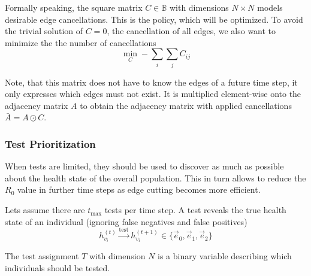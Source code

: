 Formally speaking, the square matrix $C \in \mathbb{B}$ with dimensions $N \times N$ models desirable edge cancellations.
This is the policy, which will be optimized.
To avoid the trivial solution of $C=0$, the cancellation of all edges, we also want to minimize the the number of cancellations
\begin{equation}
	\min_{C} -\sum_i \sum_j C_{ij}
\end{equation}


Note, that this matrix does not have to know the edges of a future time step, it only expresses which edges must not exist.
It is multiplied element-wise onto the adjacency matrix $A$ to obtain the adjacency matrix with applied cancellations $\bar{A} = A \odot C$.


\subsubsection{Test Prioritization}
When tests are limited, they should be used to discover as much as possible about the health state of the overall population.
This in turn allows to reduce the $R_0$ value in further time steps as edge cutting becomes more efficient.

Lets assume there are $t_{\text{max}}$ tests per time step.
A test reveals the true health state of an individual (ignoring false negatives and false positives)
\begin{equation}
h_{{v}_i}^{(t)} \xrightarrow{\text{test}} h_{{v}_i}^{(t+1)} \in \{\vec{e}_0, \vec{e}_1, \vec{e}_2 \}
\end{equation}

The test assignment $T$ with dimension $N$ is a binary variable describing which individuals should be tested.